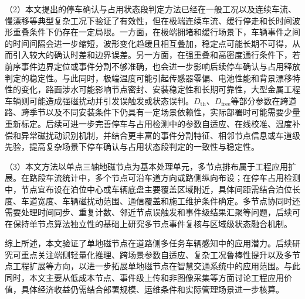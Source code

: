 \documentclass{xdupgthesis}
\begin{document}
（2）本文提出的停车确认与占用状态段判定方法已经在一般工况以及连续车流、慢漂移等典型复杂工况下验证了有效性，但在极端连续车流、缓行停走和长时间波形重叠条件下仍存在一定局限。一方面，在极端拥堵和缓行场景下，车辆事件之间的时间间隔会进一步缩短，波形变化趋缓且相互叠加，稳定点可能长期不可得，从而引入较大的确认时差和边界误差。另一方面，在强重叠和高密度通行条件下，若前序事件边界定位或事件分割不够准确，也会进一步影响后续停车确认与占用释放判定的稳定性。与此同时，极端温度可能引起传感器零偏、电池性能和背景漂移特性的变化，路面涉水可能影响节点密封、安装稳定性和长期可靠性，大型金属工程车辆则可能造成强磁扰动并引发误触发或状态误判。$D_{\mathrm{th}}$、$D_{\mathrm{free}}$等部分参数在跨道路、跨季节以及不同安装条件下仍具有一定场景依赖性，实际部署时可能需要少量重新标定。后续可进一步完善停车与占用检测中的参数自适应、在线校准、温度补偿和异常磁扰动识别机制，并结合更丰富的事件分割特征、相邻节点信息或车道级先验，提高复杂场景下停车确认与占用状态段判定的一致性与稳定性。

（3）本文方法以单点三轴地磁节点为基本处理单元，多节点排布属于工程应用扩展。在路段车流统计中，多个节点可沿车道方向或路侧纵向布设；在停车占用检测中，节点宜布设在泊位中心或车辆底盘主要覆盖区域附近，具体间距需结合泊位长度、车道宽度、车辆磁扰动范围、通信覆盖和施工维护条件确定。多节点协同时还需要处理时间同步、重复计数、邻近节点误触发和事件级结果汇聚等问题，后续可在保持单节点算法独立性的基础上研究多节点事件复核与区域级状态融合机制。

综上所述，本文验证了单地磁节点在道路侧多任务车辆感知中的应用潜力。后续研究可重点关注端侧轻量化推理、跨场景参数自适应、复杂工况鲁棒性提升以及多节点工程扩展等方向，以进一步拓展单地磁节点在智慧交通系统中的应用范围。与此同时，本文主要从低成本节点、事件级上传和非图像采集等方面讨论工程应用价值，具体经济收益仍需结合部署规模、运维条件和实际管理场景进一步核算。
\end{document}
